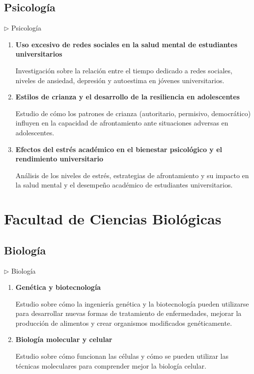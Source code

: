 \documentclass[12pt,a4paper]{article}
\begin{document}
\subsection{Psicología}
\begin{careerbox}{$\triangleright$ Psicología}
	\begin{enumerate}
		\item \textbf{Uso excesivo de redes sociales en la salud mental de estudiantes universitarios}
		
		Investigación sobre la relación entre el tiempo dedicado a redes sociales, niveles de ansiedad, depresión y autoestima en jóvenes universitarios.
		\item \textbf{Estilos de crianza y el desarrollo de la resiliencia en adolescentes}
		
		Estudio de cómo los patrones de crianza (autoritario, permisivo, democrático) influyen en la capacidad de afrontamiento ante situaciones adversas en adolescentes.
		
		\item \textbf{Efectos del estrés académico en el bienestar psicológico y el rendimiento universitario}
		
		Análisis de los niveles de estrés, estrategias de afrontamiento y su impacto en la salud mental y el desempeño académico de estudiantes universitarios.
	\end{enumerate}
\end{careerbox}

\section{Facultad de Ciencias Biológicas}
\subsection{Biología}

\begin{careerbox}{$\triangleright$ Biología}
	\begin{enumerate}
		\item \textbf{Genética y biotecnología}
		
		Estudio sobre cómo la ingeniería genética y la biotecnología pueden utilizarse para desarrollar nuevas formas de tratamiento de enfermedades, mejorar la producción de alimentos y crear organismos modificados genéticamente.
		
		\item \textbf{Biología molecular y celular}
		
		Estudio sobre cómo funcionan las células y cómo se pueden utilizar las técnicas moleculares para comprender mejor la biología celular.
	\end{enumerate}
\end{careerbox}
\end{document}
